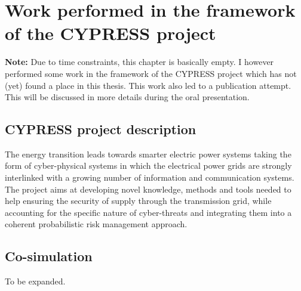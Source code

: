 \chapter{Work performed in the framework of the CYPRESS project}
\label{ch:CYPRESS}
\minitoc

\textbf{Note:} Due to time constraints, this chapter is basically empty. I however performed some work in the framework of the CYPRESS project which has not (yet) found a place in this thesis. This work also led to a publication attempt. This will be discussed in more details during the oral presentation.

\section{CYPRESS project description}

The energy transition leads towards smarter electric power systems taking the form of cyber-physical systems in which the electrical power grids are strongly interlinked with a growing number of information and communication systems. The project aims at developing novel knowledge, methods and tools needed to help ensuring the security of supply through the transmission grid, while accounting for the specific nature of cyber-threats and integrating them into a coherent probabilistic risk management approach.

\section{Co-simulation}

To be expanded.




